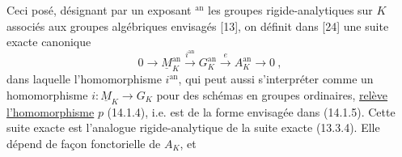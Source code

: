 Ceci posé, désignant par un exposant $^{\mathrm{an}}$ les groupes rigide-analytiques sur $K$ associés aux groupes algébriques envisagés [13], on définit dans [24] une suite exacte canonique
\[
0\longrightarrow \underline M_K^{\mathrm{an}}\xrightarrow{i^{\mathrm{an}}}G_K^{\mathrm{an}}\xrightarrow{e} A_K^{\mathrm{an}}\longrightarrow 0\ ,\tag*{(14.1.7)}
\]
dans laquelle l'homomorphisme $i^{\mathrm{an}}$, qui peut aussi s'interpréter comme un homomorphisme $i:\underline M_K\longrightarrow G_K$ pour des schémas en groupes ordinaires, \uline{relève l'homomorphisme} $p$ (14.1.4), i.e. est de la forme envisagée dans (14.1.5). Cette suite exacte est l'analogue rigide-analytique de la suite exacte (13.3.4). Elle dépend de façon fonctorielle de $A_K$, et



